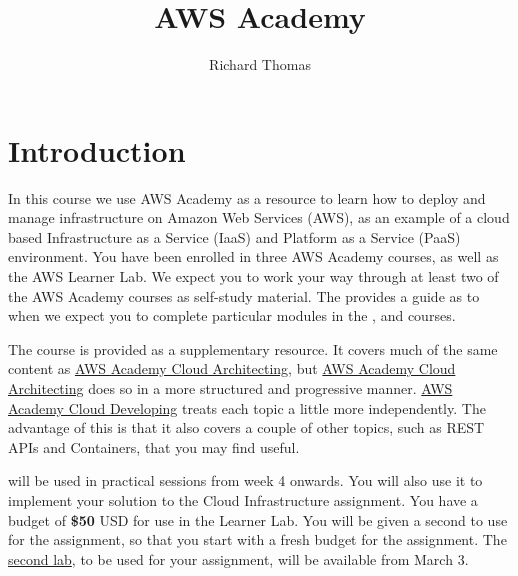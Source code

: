 \title{AWS Academy}
\author{Richard Thomas}
\date{}

\maketitle

\section{Introduction}
In this course we use AWS Academy as a resource to learn how to deploy and manage infrastructure on Amazon Web Services (AWS),
as an example of a cloud based Infrastructure as a Service (IaaS) and Platform as a Service (PaaS) environment.
You have been enrolled in three AWS Academy courses, as well as the AWS Learner Lab.
We expect you to work your way through at least two of the AWS Academy courses as self-study material.
The  provides a guide as to when we expect you to complete particular modules in the
,
and  courses.

The 
course is provided as a supplementary resource.
It covers much of the same content as
\href{https://awsacademy.instructure.com/courses/110993}{AWS Academy Cloud Architecting}, 
but \href{https://awsacademy.instructure.com/courses/110993}{AWS Academy Cloud Architecting}
does so in a more structured and progressive manner.
\href{https://awsacademy.instructure.com/courses/110994}{AWS Academy Cloud Developing}
treats each topic a little more independently.
The advantage of this is that it also covers a couple of other topics,
such as REST APIs and Containers, that you may find useful.

will be used in practical sessions from week 4 onwards.
You will also use it to implement your solution to the Cloud Infrastructure assignment.
You have a budget of \textbf{\$50} USD for use in the Learner Lab.
You will be given a second 
to use for the assignment,
so that you start with a fresh budget for the assignment.
The \href{https://awsacademy.instructure.com/courses/112082}{second lab},
to be used for your assignment, will be available from March 3.


